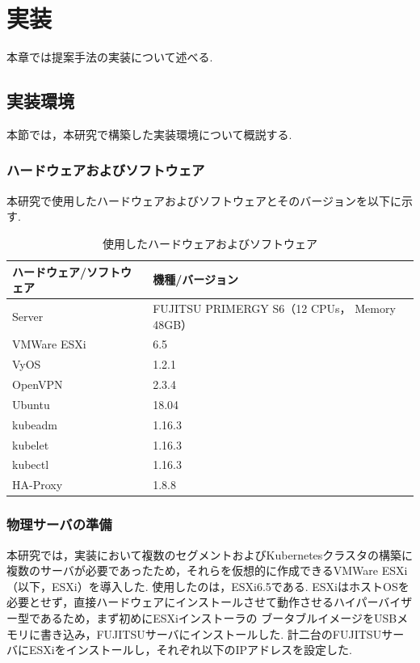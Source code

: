 \chapter{実装}
\label{implementation}

本章では提案手法の実装について述べる.

\section{実装環境}
\label{implementation:environment}

本節では，本研究で構築した実装環境について概説する.

\subsection{ハードウェアおよびソフトウェア}
\label{implementation:environment:resouces}

本研究で使用したハードウェアおよびソフトウェアとそのバージョンを以下に示す.

\begin{table}[htb]
  \begin{center}
    \caption{使用したハードウェアおよびソフトウェア}
    \begin{tabular}{|l|l|} \hline
      ハードウェア/ソフトウェア & 機種/バージョン \\ \hline
      Server & FUJITSU PRIMERGY S6（12 CPUs， Memory 48GB） \\ \hline
      VMWare ESXi & 6.5 \\ \hline
      VyOS & 1.2.1 \\ \hline
      OpenVPN & 2.3.4 \\ \hline
      Ubuntu & 18.04 \\ \hline
      kubeadm & 1.16.3 \\ \hline
      kubelet & 1.16.3 \\ \hline
      kubectl & 1.16.3 \\ \hline
      HA-Proxy & 1.8.8 \\ \hline
    \end{tabular}
  \end{center}
\end{table}

\subsection{物理サーバの準備}
\label{implementation:esxi}

本研究では，実装において複数のセグメントおよびKubernetesクラスタの構築に複数のサーバが必要であったため，それらを仮想的に作成できるVMWare ESXi（以下，ESXi）を導入した.
使用したのは，ESXi6.5である.
ESXiはホストOSを必要とせず，直接ハードウェアにインストールさせて動作させるハイパーバイザー型であるため，まず初めにESXiインストーラの
ブータブルイメージをUSBメモリに書き込み，FUJITSUサーバにインストールした.
計二台のFUJITSUサーバにESXiをインストールし，それぞれ以下のIPアドレスを設定した.

